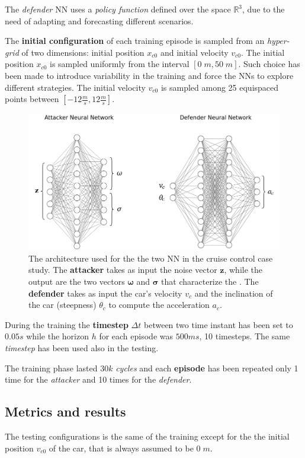 The \textit{defender} NN uses a \textit{policy function} defined over the space $\mathbb{R}^3$, due to the need of adapting and forecasting different scenarios.

The \textbf{initial configuration} of each training episode is sampled from an \textit{hyper-grid} of two dimensions: initial position $x_{c0}$ and initial velocity $v_{c0}$.
The initial position $x_{c0}$ is sampled uniformly from the interval $[0 \; m, 50 \; m]$.
Such choice has been made to introduce variability in the training and force the NNs to explore different strategies.
The initial velocity $v_{c0}$ is sampled among 25 equispaced points between $[-12 \frac{m}{s}, 12 \frac{m}{s}]$.

\begin{figure}[H]
	\centering
	\includegraphics[width=12cm, keepaspectratio]{img/5_2_NNcruisecontrol.png}
	\caption{The architecture used for the the two NN in the cruise control case study. The \textbf{attacker} takes as input the noise vector $\textbf{z}$, while the output are the two vectors $\pmb{\omega}$ and $\pmb{\sigma}$ that characterize the . The \textbf{defender} takes as input the car's velocity $v_c$ and the inclination of the car (steepness) $\theta_c$ to compute the acceleration $a_c$.}
\end{figure}

During the training the \textbf{timestep} $\Delta t$ between two time instant has been set to $0.05s$ while the horizon $h$ for each episode was $500ms$, 10 timesteps.
The same \textit{timestep} has been used also in the testing.

The training phase lasted $30k$ \textit{cycles} and each \textbf{episode} has been repeated only 1 time for the \textit{attacker} and 10 times for the \textit{defender}.

\subsection{Metrics and results}
The testing configurations is the same of the training except for the the initial position $v_{c0}$ of the car, that is always assumed to be $0 \; m$.

